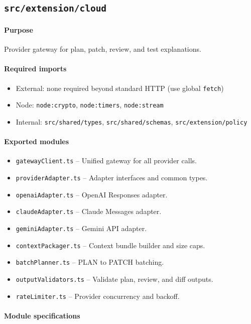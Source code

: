 \documentclass[11pt]{article}
\begin{document}
\subsection{\texttt{src/extension/cloud}}
\paragraph{Purpose} Provider gateway for plan, patch, review, and test explanations.

\paragraph{Required imports}
\begin{itemize}[noitemsep]
  \item External: none required beyond standard HTTP (use global \texttt{fetch})
  \item Node: \texttt{node:crypto}, \texttt{node:timers}, \texttt{node:stream}
  \item Internal: \texttt{src/shared/types}, \texttt{src/shared/schemas}, \texttt{src/extension/policy}
\end{itemize}

\paragraph{Exported modules}
\begin{itemize}[noitemsep]
  \item \texttt{gatewayClient.ts} -- Unified gateway for all provider calls.
  \item \texttt{providerAdapter.ts} -- Adapter interfaces and common types.
  \item \texttt{openaiAdapter.ts} -- OpenAI Responses adapter.
  \item \texttt{claudeAdapter.ts} -- Claude Messages adapter.
  \item \texttt{geminiAdapter.ts} -- Gemini API adapter.
  \item \texttt{contextPackager.ts} -- Context bundle builder and size caps.
  \item \texttt{batchPlanner.ts} -- PLAN to PATCH batching.
  \item \texttt{outputValidators.ts} -- Validate plan, review, and diff outputs.
  \item \texttt{rateLimiter.ts} -- Provider concurrency and backoff.
\end{itemize}

\paragraph{Module specifications}
\end{document}

